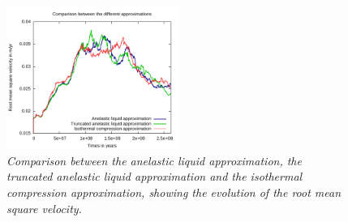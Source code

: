 \begin{figure}
\centering
  \includegraphics[width=0.5\textwidth]{cookbooks/burnman/doc/vrms.pdf}
  \caption{\it Comparison between the anelastic liquid approximation,
               the truncated anelastic liquid approximation
               and the isothermal compression approximation,
               showing the evolution of the root mean square velocity.}
  \label{fig:burnman-vrms}
\end{figure}
